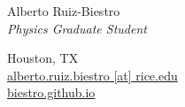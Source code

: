 \documentclass[letterpaper,11pt,notitlepage]{article}
\newcommand{\hmargin}{1.7cm} %
\begin{document}
\pagestyle{fancy}
\begin{minipage}[t][\hmargin][c]{0.60\textwidth}
	
    {\Huge{Alberto Ruiz-Biestro} }\\[0.8em]
	{\color{darkgray}\itshape\Large Physics Graduate Student}
	
\end{minipage}
\hfill
\begin{minipage}[t][\hmargin][c]{0.35\textwidth}
\raggedleft\color{darkgray}
Houston, TX\\
\href{mailto:alberto.ruiz.biestro@rice.edu}{alberto.ruiz.biestro [at] rice.edu}\\
\href{https://biestro.github.io/}{biestro.github.io}\\
\end{minipage}

\vspace{0.5in}
\end{document}
